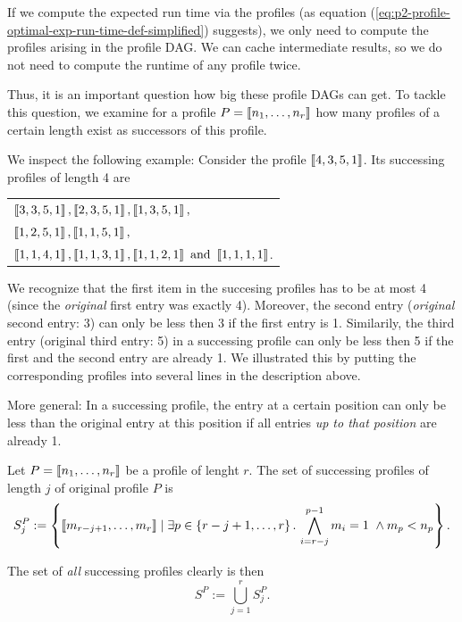 If we compute the expected run time via the profiles (as equation (\ref{eq:p2-profile-optimal-exp-run-time-def-simplified}) suggests), we only need to compute the profiles arising in the profile DAG. We can cache intermediate results, so we do not need to compute the runtime of any profile twice.

Thus, it is an important question how big these profile DAGs can get. To tackle this question, we examine for a profile $P=\left\llbracket n_1,\dots,n_r \right\rrbracket$ how many profiles of a certain length exist as successors of this profile.

We inspect the following example: Consider the profile $\left\llbracket 4,3,5,1 \right\rrbracket$. Its successing profiles of length 4 are
\begin{center}
  \begin{tabular}{l}
    $\left\llbracket 3, 3, 5, 1 \right\rrbracket, \left\llbracket 2, 3, 5, 1 \right\rrbracket, \left\llbracket 1, 3, 5, 1 \right\rrbracket,$ \\
    $\left\llbracket 1, 2, 5, 1 \right\rrbracket, \left\llbracket 1, 1, 5, 1 \right\rrbracket,$ \\
    $\left\llbracket 1, 1, 4, 1 \right\rrbracket,
    \left\llbracket 1, 1, 3, 1 \right\rrbracket,
    \left\llbracket 1, 1, 2, 1 \right\rrbracket \text{ and }
    \left\llbracket 1, 1, 1, 1 \right\rrbracket$.
  \end{tabular}
\end{center}

We recognize that the first item in the succesing profiles has to be at most 4 (since the \emph{original} first entry was exactly 4). Moreover, the second entry (\emph{original} second entry: 3) can only be less then 3 if the first entry is 1. Similarily, the third entry (original third entry: 5) in a successing profile can only be less then 5 if the first and the second entry are already 1.
We illustrated this by putting the corresponding profiles into several lines in the description above.

More general: In a successing profile, the entry at a certain position can only be less than the original entry at this position if all entries \emph{up to that position} are already 1.

\begin{definition}
Let $P=\left\llbracket n_1,\dots,n_r \right\rrbracket$ be a profile of lenght $r$. The set of successing profiles of length $j$ of original profile $P$ is
\begin{equation*}
  S^P_{j}
  :=
  \left\{ 
    \left\llbracket m_{r-j+1},\dots,m_{r} \right\rrbracket
    \mid
    \exists p \in \left\{ r-j+1,\dots,r \right\}.\,
    \bigwedge_{i=r-j}^{p-1} m_i = 1 \ \wedge m_p < n_p
  \right\}.
\end{equation*}

The set of \emph{all} successing profiles clearly is then
\begin{equation*}
  S^P
  :=
  \bigcup_{j=1}^r S^P_j.
\end{equation*}
\end{definition}

